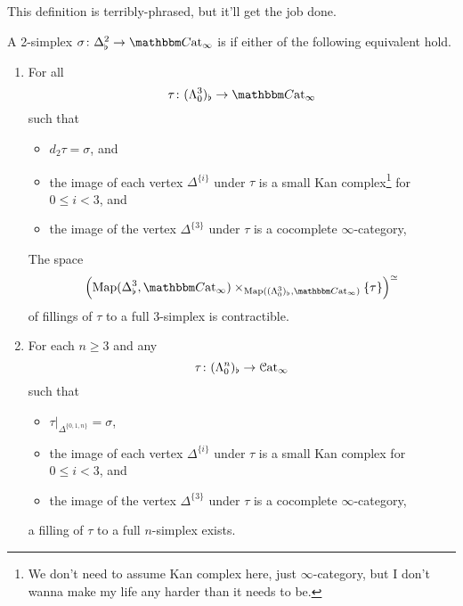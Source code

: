 \documentclass[main.tex]{subfiles}
\begin{document}
This definition is terribly-phrased, but it'll get the job done.
\begin{definition}
  \label{def:left_kan}
  A 2-simplex $\sigma\colon \Delta^{2}_{\flat} \to \ICCat$ is  if either of the following equivalent hold.
  \begin{enumerate}
    \item For all
      \begin{equation*}
        \tau\colon ( \Lambda^{3}_{0} )_{\flat} \to \ICCat
      \end{equation*}
      such that 
      \begin{itemize}
        \item $d_{2}\tau = \sigma$, and

        \item the image of each vertex $\Delta^{\{i\}}$ under $\tau$ is a small Kan complex\footnote{We don't need to assume Kan complex here, just $\infty$-category, but I don't wanna make my life any harder than it needs to be.} for $0 \leq i < 3$, and

        \item the image of the vertex $\Delta^{\{3\}}$ under $\tau$ is a cocomplete $\infty$-category,
      \end{itemize}
      The space
      \begin{equation*}
        \left( \Map(\Delta^{3}_{\flat}, \ICCat) \times_{\Map((\Lambda^{3}_{0})_{\flat}, \ICCat)} \{\tau\} \right)^{\simeq}
      \end{equation*}
      of fillings of $\tau$ to a full 3-simplex is contractible.

    \item For each $n \geq 3$ and any
      \begin{equation*}
        \tau\colon (\Lambda^{n}_{0})_{\flat} \to \mathcal{C}\mathrm{at}_{\infty}
      \end{equation*}
      such that 
      \begin{itemize}
        \item $\tau|_{\Delta^{\{0,1,n\}}} = \sigma$,

        \item the image of each vertex $\Delta^{\{i\}}$ under $\tau$ is a small Kan complex for $0 \leq i < 3$, and

        \item the image of the vertex $\Delta^{\{3\}}$ under $\tau$ is a cocomplete $\infty$-category,
      \end{itemize}
      a filling of $\tau$ to a full $n$-simplex exists.
  \end{enumerate}


\end{definition}
\end{document}
